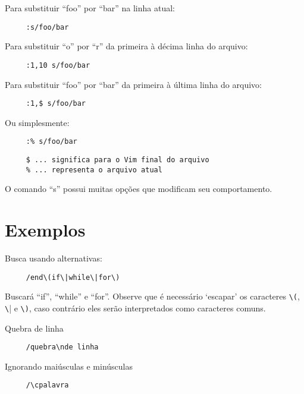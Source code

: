 Para substituir ``foo'' por ``bar'' na linha atual:

\begin{verbatim}
     :s/foo/bar
\end{verbatim}

Para substituir ``o'' por ``r'' da primeira à décima linha do arquivo:

\begin{verbatim}
     :1,10 s/foo/bar
\end{verbatim}

Para substituir ``foo'' por ``bar'' da primeira à última linha do arquivo:

\begin{verbatim}
     :1,$ s/foo/bar
\end{verbatim}

Ou simplesmente:

\begin{verbatim}
     :% s/foo/bar
\end{verbatim}

\begin{verbatim}
     $ ... significa para o Vim final do arquivo
     % ... representa o arquivo atual
\end{verbatim}

O comando ``s'' possui muitas opções que modificam seu comportamento.

\section{Exemplos }
\label{Exemplos }

Busca usando alternativas:

\begin{verbatim}
     /end\(if\|while\|for\)
\end{verbatim}

Buscará ``if'', ``while'' e ``for''.  Observe que é necessário `escapar' os
caracteres \verb|\(|, \verb|\|| e \verb|\)|, caso contrário eles serão
interpretados como caracteres comuns.

Quebra de linha

\begin{verbatim}
     /quebra\nde linha
\end{verbatim}

Ignorando maiúsculas e minúsculas

\begin{verbatim}
     /\cpalavra
\end{verbatim}

